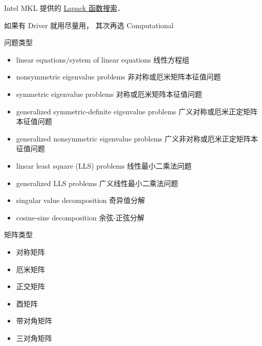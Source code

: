 
\begin{issues}
\issueDraft
\end{issues}


Intel MKL 提供的 \href{https://www.intel.com/content/www/us/en/developer/tools/oneapi/onemkl-function-finding-advisor.html}{Lapack 函数搜索}．

如果有 Driver 就用尽量用， 其次再选 Computational

问题类型
\begin{itemize}
\item linear equations/system of linear equations 线性方程组
\item nonsymmetric eigenvalue problems 非对称或厄米矩阵本征值问题
\item symmetric eigenvalue problems 对称或厄米矩阵本征值问题
\item generalized symmetric-definite eigenvalue problems 广义对称或厄米正定矩阵本征值问题
\item generalized nonsymmetric eigenvalue problems 广义非对称或厄米正定矩阵本征值问题
\item linear least square (LLS) problems 线性最小二乘法问题
\item generalized LLS problems 广义线性最小二乘法问题
\item singular value decomposition 奇异值分解
\item cosine-sine decomposition 余弦-正弦分解
\end{itemize}

矩阵类型
\begin{itemize}
\item 对称矩阵
\item 厄米矩阵
\item 正交矩阵
\item 酉矩阵
\item 带对角矩阵
\item 三对角矩阵
\end{itemize}


